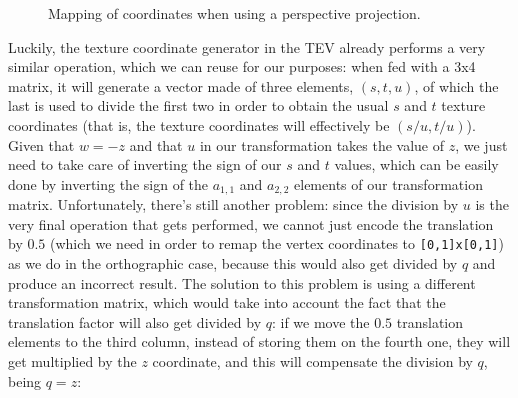 \documentclass[12pt]{article}
\begin{document}
\begin{figure}[ht]
\centering
{}
\hspace{1em}
\caption{Mapping of coordinates when using a perspective projection.}
\label{fig:transperspective}
\end{figure}

Luckily, the texture coordinate generator in the TEV already performs a very similar operation, which we can reuse for our purposes: when fed with a 3x4 matrix, it will generate a vector made of three elements, $(s, t, u)$, of which the last is used to divide the first two in order to obtain the usual $s$ and $t$ texture coordinates (that is, the texture coordinates will effectively be $(s/u, t/u)$). Given that $w = -z$ and that $u$ in our transformation takes the value of $z$, we just need to take care of inverting the sign of our $s$ and $t$ values, which can be easily done by inverting the sign of the $a_{1,1}$ and $a_{2,2}$ elements of our transformation matrix. Unfortunately, there's still another problem: since the division by $u$ is the very final operation that gets performed, we cannot just encode the translation by $0.5$ (which we need in order to remap the vertex coordinates to \lstinline{[0,1]x[0,1]}) as we do in the orthographic case, because this would also get divided by $q$ and produce an incorrect result. The solution to this problem is using a different transformation matrix, which would take into account the fact that the translation factor will also get divided by $q$: if we move the $0.5$ translation elements to the third column, instead of storing them on the fourth one, they will get multiplied by the $z$ coordinate, and this will compensate the division by $q$, being $q = z$:
\end{document}
